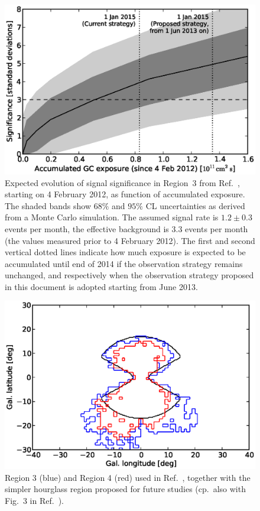 \documentclass[aps,prd,superscriptaddress,nofootinbib,fixlfloat, 12pt]{revtex4-1}
\begin{document}
\begin{figure}[h]
  \begin{center}
    \includegraphics[width=0.6\linewidth]{plots/projection.eps}
    \vspace{-0.5cm}
  \end{center}
  \caption{
    Expected evolution of signal significance in Region~3 from
    Ref.~\cite{Weniger:2012}, starting on 4
    February 2012, as function of
    accumulated exposure.  The shaded bands show $68\%$ and $95\%$ CL
    uncertainties as derived from a Monte Carlo simulation.  The assumed
    signal rate is $1.2\pm 0.3$ events per month, the effective background is
    $3.3$ events per month (the values measured prior to 4 February 2012).
    The first and second vertical dotted lines indicate how much exposure is
    expected to be accumulated until end of 2014 if the observation strategy remains
    unchanged, and respectively when the observation strategy proposed in this
    document is adopted starting from June 2013.}
  \label{fig:projection}
\end{figure}

\begin{figure}[h]
  \begin{center}
    \includegraphics[width=0.6\linewidth]{plots/regions.eps}
    \vspace{-0.5cm}
  \end{center}
  \caption{Region 3 (blue) and Region 4 (red) used in
  Ref.~\cite{Weniger:2012}, together with the simpler hourglass region
  proposed for future studies (cp.~also with Fig.~3 in
  Ref.~\cite{Bringmann:2012ez}).}
  \label{fig:projection}
\end{figure}
\end{document}
